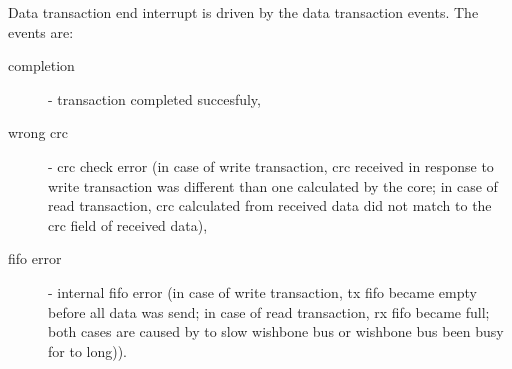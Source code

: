     Data transaction end interrupt is driven by the data transaction events. The events are:
    \begin{description}
    \item[completion] - transaction completed succesfuly,
    \item[wrong crc] - crc check error (in case of write transaction, crc received in response to write transaction was different than one calculated by the core; 
    in case of read transaction, crc calculated from received data did not match to the crc field of received data),
    \item[fifo error] - internal fifo error (in case of write transaction, tx fifo became empty before all data was send; in case of read transaction, rx fifo became
    full; both cases are caused by to slow wishbone bus or wishbone bus been busy for to long)).
    \end{description}
    

    